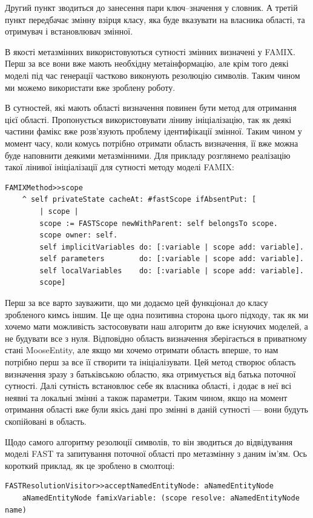 \documentclass[12pt,a4paper]{article}
\begin{document}
Другий пункт зводиться до занесення пари ключ--значення у словник. А третій пункт передбачає змінну взірця класу, яка буде вказувати на власника області, та отримувач і встановлювач змінної.

В якості метазмінних використовуються сутності змінних визначені у FAMIX. Перш за все вони вже мають необхідну метаінформацію, але крім того деякі моделі під час генерації частково виконують резолюцію символів. Таким чином ми можемо використати вже зроблену роботу.

В сутностей, які мають області визначення повинен бути метод для отримання цієї області. Пропонується використовувати ліниву ініціалізацію, так як деякі частини фамікс вже розв'язують проблему ідентифікації змінної. Таким чином у момент часу, коли комусь потрібно отримати область визначення, її вже можна буде наповнити деякими метазмінними. Для прикладу розглянемо реалізацію такої лінивої ініціалізації для сутності методу моделі FAMIX:
\begin{lstlisting}[language=Smalltalk]
FAMIXMethod>>scope
	^ self privateState cacheAt: #fastScope ifAbsentPut: [
		| scope |
		scope := FASTScope newWithParent: self belongsTo scope.
		scope owner: self.
		self implicitVariables do: [:variable | scope add: variable].
		self parameters        do: [:variable | scope add: variable].
		self localVariables    do: [:variable | scope add: variable].
		scope]
\end{lstlisting}

Перш за все варто зауважити, що ми додаємо цей функціонал до класу зробленого кимсь іншим. Це ще одна позитивна сторона цього підходу, так як ми хочемо мати можливість застосовувати наш алгоритм до вже існуючих моделей, а не будувати все з нуля. Відповідно область визначення зберігається в приватному стані MooseEntity, але якщо ми хочемо отримати область вперше, то нам потрібно перш за все її створити та ініціалізувати. Цей метод створює область визначення зразу з батьківською областю, яка отримується від батька поточної сутності. Далі сутність встановлює себе як власника області, і додає в неї всі неявні та локальні змінні а також параметри. Таким чином, якщо на момент отримання області вже були якісь дані про змінні в даній сутності --- вони будуть скопійовані в область.

Щодо самого алгоритму резолюції символів, то він зводиться до відвідування моделі FAST та запитування поточної області про метазмінну з даним ім'ям. Ось короткий приклад, як це зроблено в смолтоці:
\begin{lstlisting}[language=Smalltalk]
FASTResolutionVisitor>>acceptNamedEntityNode: aNamedEntityNode
	aNamedEntityNode famixVariable: (scope resolve: aNamedEntityNode name)
\end{lstlisting}
\end{document}
